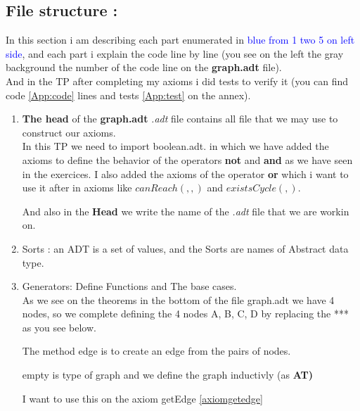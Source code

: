 \documentclass[a4paper,11pt,final]{article}
\begin{document}
\subsection{File structure :}
In this section i am describing each part enumerated in \textcolor{blue}{blue from 1 two 5 on left side}, and each part i explain the code line by line (you see on the left the gray background the number of the code line on the \textbf{graph.adt} file).\\
And in the TP after completing my axioms i did tests to verify it (you can find code \ref{App:code} lines and tests \ref{App:test} on the annex).
\begin{enumerate}[label=\color{blue}\theenumi]
\item \textbf{The head} of the  \textbf{graph.adt} \textit{.adt} file contains all file that we may use to construct our axioms.\\
In this TP we need to import {\textcolor{colour3}{boolean.adt}}.\label{importboolean}
\noindent
 in which we have added  the axioms to define the behavior of the operators \textbf{not} and \textbf{and} as we have seen in the exercices. I also added the axioms of the operator \textbf{or} which i want to use it after in axioms like $canReach(,,)$ and $existsCycle(,)$.

\bigskip
\noindent And also in the \textbf{Head} we write the name of the \textit {.adt} file that we are workin on.


\item \textcolor{colour0}{Sorts} \label{sort}: an ADT is a set of values, and the Sorts are names of Abstract data type.
\newpage
\item \textcolor{colour0}{Generators}\label{generator}: Define Functions and The base cases.\\
As we see on the theorems in the bottom of the file graph.adt we have 4 nodes, so we complete defining the 4 nodes A, B, C, D by replacing the *** as you see below.


\bigskip\noindent

The method edge is to create an edge from the pairs of nodes.\\
\bigskip\noindent

empty is type of graph and we define the graph inductivly (as \textbf{AT)}\\
\bigskip\noindent

\label{noedge}I want to use this on the axiom getEdge \ref{axiomgetedge}\\


\end{enumerate}
\end{document}
